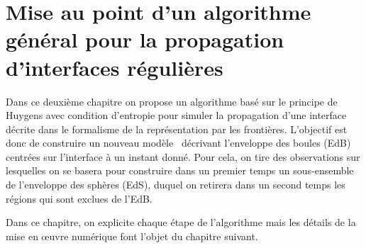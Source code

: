 \chapter[Algorithme général pour la propagation d'interfaces $\contgeom{1}$ \piecewise]{Mise au point d'un algorithme général pour la propagation d'interfaces régulières \piecewise}
\label{chap:algo_general}



Dans ce deuxième chapitre on propose un algorithme basé sur le principe de Huygens avec condition d'entropie pour simuler la propagation d'une interface décrite dans le formalisme de la représentation par les frontières. 
L'objectif est donc de construire un nouveau modèle \brep\ décrivant l'enveloppe des boules (EdB) centrées sur l'interface à un instant donné.
Pour cela, on tire des observations sur lesquelles on se basera pour construire dans un premier temps un sous-ensemble de l'enveloppe des sphères (EdS), duquel on retirera dans un second temps les régions qui sont exclues de l'EdB.
\par
Dans ce chapitre, on explicite chaque étape de l'algorithme mais les détails de la mise en \oe uvre numérique font l'objet du chapitre suivant.





